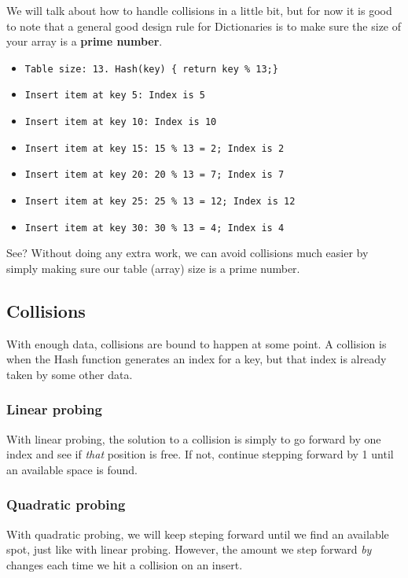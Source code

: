\documentclass[a4paper,12pt,oneside]{book}
\begin{document}
We will talk about how to handle collisions in a little bit, but for now
it is good to note that a general good design rule for Dictionaries
is to make sure the size of your array is a \textbf{prime number}.

\begin{itemize}
    \item \texttt{Table size: 13. Hash(key) \{ return key \% 13;\}}
    \item \texttt{Insert item at key 5: Index is 5}
    \item \texttt{Insert item at key 10: Index is 10}
    \item \texttt{Insert item at key 15: 15 \% 13 = 2; \tab Index is 2}
    \item \texttt{Insert item at key 20: 20 \% 13 = 7; \tab Index is 7}
    \item \texttt{Insert item at key 25: 25 \% 13 = 12; \tab Index is 12 }
    \item \texttt{Insert item at key 30: 30 \% 13 = 4; \tab Index is 4 }
\end{itemize}

See? Without doing any extra work, we can avoid collisions much easier
by simply making sure our table (array) size is a prime number.


\subsection{Collisions}

With enough data, collisions are bound to happen at some point. A collision
is when the Hash function generates an index for a key, but that index
is already taken by some other data.

\subsubsection{Linear probing}

With linear probing, the solution to a collision is simply to go forward
by one index and see if \textit{that} position is free. If not,
continue stepping forward by 1 until an available space is found.

\subsubsection{Quadratic probing}

With quadratic probing, we will keep steping forward until we find
an available spot, just like with linear probing. However, the amount
we step forward \textit{by} changes each time we hit a collision on an insert.
\end{document}
